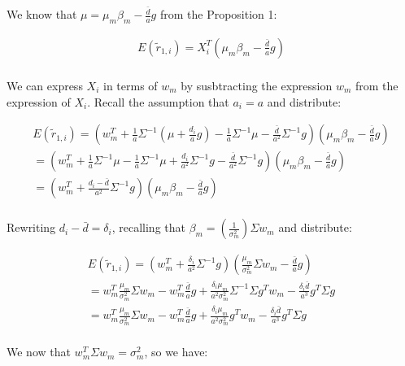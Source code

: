 We know that $\mu = \mu_m \beta_m - \frac{\bar{d}}{a} g$ from the Proposition 1:

\begin{equation}
    \begin{aligned}
E(\tilde{r}_{1,i}) = X_i^T (\mu_m \beta_m - \frac{\bar{d}}{a} g) \\
    \end{aligned}
\end{equation}

We can express $X_i$ in terms of $w_m$ by susbtracting the expression $w_m$ 
from the expression of $X_i$. Recall the assumption that $a_i = a$ and distribute:

\begin{equation}
    \begin{aligned}
        E(\tilde{r}_{1,i}) = (w_m^T + \frac{1}{a} \Sigma^{-1} (\mu + \frac{d_i}{a}g) - \frac{1}{a} \Sigma^{-1} \mu - \frac{\bar{d}}{a^2} \Sigma^{-1} g) (\mu_m \beta_m - \frac{\bar{d}}{a} g) \\
        = (w_m^T + \frac{1}{a} \Sigma^{-1}\mu - \frac{1}{a} \Sigma^{-1} \mu + \frac{d_i}{a^2}\Sigma^{-1}g - \frac{\bar{d}}{a^2} \Sigma^{-1}g)(\mu_m \beta_m - \frac{\bar{d}}{a}g)\\
        = (w_m^T + \frac{d_i - \bar{d}}{a^2} \Sigma^{-1} g) (\mu_m \beta_m - \frac{\bar{d}}{a} g) \\
    \end{aligned}
\end{equation}

Rewriting $d_i - \bar{d} = \delta_i$, recalling that $\beta_m = (\frac{1}{\sigma^2_m})\Sigma w_m$ and distribute:

\begin{equation}
    \begin{aligned}
        E(\tilde{r}_{1,i}) = (w_m^T + \frac{\delta_i}{a^2} \Sigma^{-1} g) (\frac{\mu_m}{\sigma^2_m} \Sigma w_m - \frac{\bar{d}}{a}g) \\
= w_m^T \frac{\mu_m}{\sigma^2_m} \Sigma w_m - w_m^T \frac{\bar{d}}{a} g + \frac{\delta_i \mu_m}{a^2\sigma^2_m}\Sigma^{-1}\Sigma g^T w_m - \frac{\delta_i \bar{d}}{a^3} g^T \Sigma g \\
= w_m^T \frac{\mu_m}{\sigma^2_m} \Sigma w_m - w_m^T \frac{\bar{d}}{a} g + \frac{\delta_i \mu_m}{a^2\sigma^2_m} g^T w_m - \frac{\delta_i \bar{d}}{a^3} g^T \Sigma g\\
    \end{aligned}
\end{equation}

We now that $w_m^T \Sigma w_m = \sigma^2_m$, so we have:

